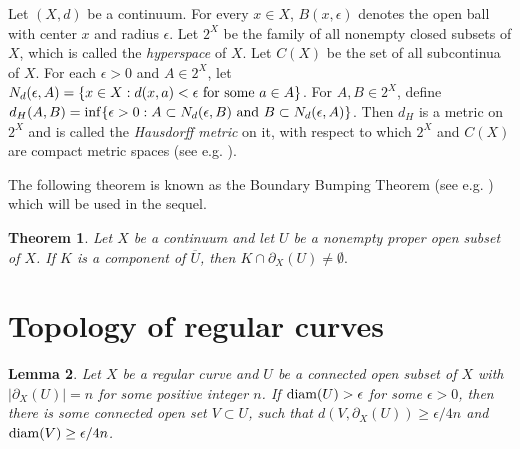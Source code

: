 \documentclass[12pt,a4paper]{amsart}
\newtheorem{thm}{Theorem}[section]
\newtheorem{lem}[thm]{Lemma}
\theoremstyle{definition}
\numberwithin{equation}{section}
\begin{document}
Let $(X,d)$ be a continuum. For every $x\in X$, $B(x,\epsilon)$ denotes the open ball with center $x$ and radius $\epsilon$.
Let $2^X$ be the family of all nonempty closed subsets of $X$, which is called the {\it hyperspace} of $X$. Let
  $C(X)$ be the set of all subcontinua of $X$. For each $\epsilon>0$ and $A\in 2^X$, let $N_d(\epsilon,A)=\{x\in X: d(x,a)<\epsilon \ {\rm for\ some\ } a\in A\}$. For $A,B\in 2^X$, define $d_H(A,B)={\rm inf}\{\epsilon>0: A\subset N_d(\epsilon,B) {\rm \ and\ } B\subset N_d(\epsilon,A)\}$. Then $d_H$ is a metric on  $2^X$ and is called the {\it Hausdorff metric} on it, with respect to which
 $2^X$ and $C(X)$ are  compact metric spaces (see e.g. \cite{Na}).

The following theorem is known as the Boundary Bumping Theorem (see e.g. \cite[p. 73]{Na}) which will be used in the sequel.

\begin{thm}\label{Boundary bumping}
Let $X$ be a continuum and let $U$ be a nonempty proper open subset of $X$. If $K$ is a component of $\overline U$, then $K\cap \partial_X(U)\not=\emptyset.$
\end{thm}


\section{Topology of regular curves}


\begin{lem}\label{large subcontinua}
Let $X$ be a regular curve and $U$ be a connected open subset of $X$ with $|\partial_X(U)|=n$ for some positive integer $n$.
If ${\rm diam}(U)>\epsilon$ for some $\epsilon>0$, then there is some connected open set $V\subset U$, such that $d(V, \partial_X(U))\geq \epsilon/4n$
and ${\rm diam}(V)\geq \epsilon/4n$.
\end{lem}
\end{document}
